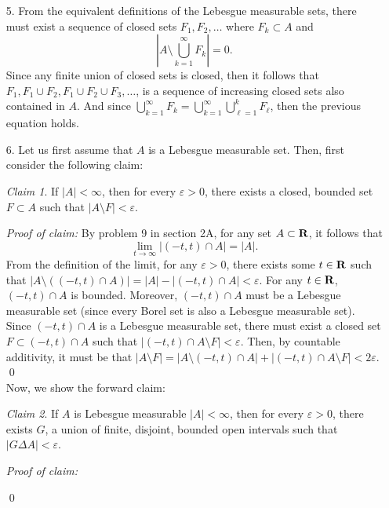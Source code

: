 \documentclass{article}
\newcommand{\eps}{\varepsilon}
\theoremstyle{remark}
\newtheorem{claim}{Claim}
\newenvironment{poc}{\textit{Proof of claim:}}{\qed\\}
\begin{document}
\thispagestyle{firstpage}
\begin{enumerate}[leftmargin=*]
    \item[5.] From the equivalent definitions of the Lebesgue measurable sets,
    there must exist a sequence of closed sets $F_1, F_2, \ldots$ where $F_k
    \subset A$ and 
    \[
        \left|A \setminus \bigcup_{k=1}^{\infty} F_k\right| = 0.
    \]
    Since any finite union of closed sets is closed, then it follows that $F_1,
    F_1 \cup F_2, F_1 \cup F_2 \cup F_3, \ldots$, is a sequence of increasing
    closed sets also contained in $A$. And since $\bigcup_{k=1}^\infty F_k =
    \bigcup_{k=1}^\infty \bigcup_{\ell=1}^k F_\ell$, then the previous equation
    holds.
    \item[6.] Let us first assume that $A$ is a Lebesgue measurable set. Then,
    first consider the following claim:
    \begin{claim}\label{claim:closed-bounded}
        If $|A| < \infty$, then for every $\eps >0$, there exists a closed,
        bounded set $F \subset A$ such that $|A \setminus F| < \eps$. 
    \end{claim}
    \begin{poc}
        By problem 9 in section 2A, for any set $A \subset \mathbf{R}$, it follows that 
        \[
            \lim_{t\to\infty} |(-t,t) \cap A| = |A|.    
        \]
        From the definition of the limit, for any $\eps > 0$, there exists some
        $t\in\mathbf{R}$ such that $|A \setminus \left((-t,t)\cap A\right)| = |A| -
        |(-t, t)\cap A| < \eps$. For any $t \in \mathbf{R}$, $(-t, t) \cap A$ is
        bounded. Moreover, $(-t, t) \cap A$ must be a Lebesgue measurable set
        (since every Borel set is also a Lebesgue measurable set). Since $(-t,
        t) \cap A$ is a Lebesgue measurable set, there must exist a closed set
        $F \subset (-t, t) \cap A$ such that $|(-t, t) \cap A \setminus F| <
        \eps$. Then, by countable additivity, it must be that $|A \setminus F| =
        |A \setminus (-t, t)\cap A| + |(-t, t) \cap A \setminus F| < 2\eps$.
    \end{poc}
    Now, we show the forward claim:
    \begin{claim}
        If $A$ is Lebesgue measurable $|A| < \infty$, then for every $\eps > 0$,
        there exists $G$, a union of finite, disjoint, bounded open intervals
        such that $|G \Delta A| < \eps$. 
    \end{claim}
    \begin{poc}


\end{poc}
\end{enumerate}
\end{document}
